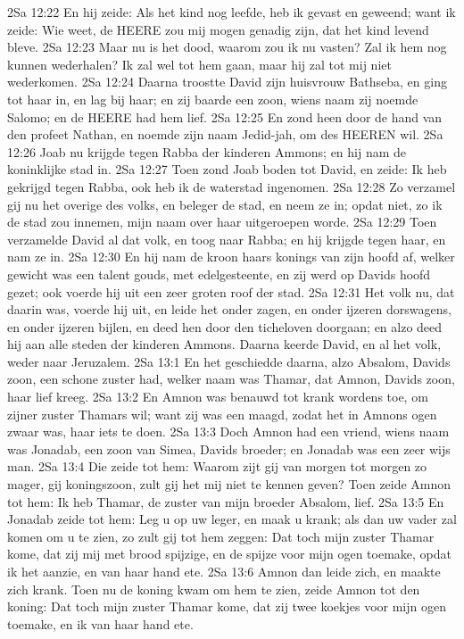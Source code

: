 2Sa 12:22  En hij zeide: Als het kind nog leefde, heb ik gevast en geweend; want ik zeide: Wie weet, de HEERE zou mij mogen genadig zijn, dat het kind levend bleve.
2Sa 12:23  Maar nu is het dood, waarom zou ik nu vasten? Zal ik hem nog kunnen wederhalen? Ik zal wel tot hem gaan, maar hij zal tot mij niet wederkomen.
2Sa 12:24  Daarna troostte David zijn huisvrouw Bathseba, en ging tot haar in, en lag bij haar; en zij baarde een zoon, wiens naam zij noemde Salomo; en de HEERE had hem lief.
2Sa 12:25  En zond heen door de hand van den profeet Nathan, en noemde zijn naam Jedid-jah, om des HEEREN wil.
2Sa 12:26  Joab nu krijgde tegen Rabba der kinderen Ammons; en hij nam de koninklijke stad in.
2Sa 12:27  Toen zond Joab boden tot David, en zeide: Ik heb gekrijgd tegen Rabba, ook heb ik de waterstad ingenomen.
2Sa 12:28  Zo verzamel gij nu het overige des volks, en beleger de stad, en neem ze in; opdat niet, zo ik de stad zou innemen, mijn naam over haar uitgeroepen worde.
2Sa 12:29  Toen verzamelde David al dat volk, en toog naar Rabba; en hij krijgde tegen haar, en nam ze in.
2Sa 12:30  En hij nam de kroon haars konings van zijn hoofd af, welker gewicht was een talent gouds, met edelgesteente, en zij werd op Davids hoofd gezet; ook voerde hij uit een zeer groten roof der stad.
2Sa 12:31  Het volk nu, dat daarin was, voerde hij uit, en leide het onder zagen, en onder ijzeren dorswagens, en onder ijzeren bijlen, en deed hen door den ticheloven doorgaan; en alzo deed hij aan alle steden der kinderen Ammons. Daarna keerde David, en al het volk, weder naar Jeruzalem.
2Sa 13:1  En het geschiedde daarna, alzo Absalom, Davids zoon, een schone zuster had, welker naam was Thamar, dat Amnon, Davids zoon, haar lief kreeg.
2Sa 13:2  En Amnon was benauwd tot krank wordens toe, om zijner zuster Thamars wil; want zij was een maagd, zodat het in Amnons ogen zwaar was, haar iets te doen.
2Sa 13:3  Doch Amnon had een vriend, wiens naam was Jonadab, een zoon van Simea, Davids broeder; en Jonadab was een zeer wijs man.
2Sa 13:4  Die zeide tot hem: Waarom zijt gij van morgen tot morgen zo mager, gij koningszoon, zult gij het mij niet te kennen geven? Toen zeide Amnon tot hem: Ik heb Thamar, de zuster van mijn broeder Absalom, lief.
2Sa 13:5  En Jonadab zeide tot hem: Leg u op uw leger, en maak u krank; als dan uw vader zal komen om u te zien, zo zult gij tot hem zeggen: Dat toch mijn zuster Thamar kome, dat zij mij met brood spijzige, en de spijze voor mijn ogen toemake, opdat ik het aanzie, en van haar hand ete.
2Sa 13:6  Amnon dan leide zich, en maakte zich krank. Toen nu de koning kwam om hem te zien, zeide Amnon tot den koning: Dat toch mijn zuster Thamar kome, dat zij twee koekjes voor mijn ogen toemake, en ik van haar hand ete.
